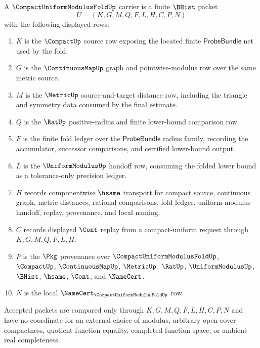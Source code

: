 \begin{definition}
\label{def:compact-uniform-modulus-fold-carrier}
A $\CompactUniformModulusFoldUp$ carrier is a finite $\BHist$ packet
$$
U=(K,G,M,Q,F,L,H,C,P,N)
$$
with the following displayed rows:
\begin{enumerate}
\item $K$ is the $\CompactUp$ source row exposing the located finite $\mathsf{ProbeBundle}$ net used by the fold.
\item $G$ is the $\ContinuousMapUp$ graph and pointwise-modulus row over the same metric source.
\item $M$ is the $\MetricUp$ source-and-target distance row, including the triangle and symmetry data consumed by the final estimate.
\item $Q$ is the $\RatUp$ positive-radius and finite lower-bound comparison row.
\item $F$ is the finite fold ledger over the $\mathsf{ProbeBundle}$ radius family, recording the accumulator, successor comparisons, and certified lower-bound output.
\item $L$ is the $\UniformModulusUp$ handoff row, consuming the folded lower bound as a tolerance-only precision ledger.
\item $H$ records componentwise $\hsame$ transport for compact source, continuous graph, metric distances, rational comparisons, fold ledger, uniform-modulus handoff, replay, provenance, and local naming.
\item $C$ records displayed $\Cont$ replay from a compact-uniform request through $K,G,M,Q,F,L,H$.
\item $P$ is the $\Pkg$ provenance over $\CompactUniformModulusFoldUp$, $\CompactUp$, $\ContinuousMapUp$, $\MetricUp$, $\RatUp$, $\UniformModulusUp$, $\BHist$, $\hsame$, $\Cont$, and $\NameCert$.
\item $N$ is the local $\NameCert_{\CompactUniformModulusFoldUp}$ row.
\end{enumerate}
Accepted packets are compared only through $K,G,M,Q,F,L,H,C,P,N$ and have no coordinate for an external choice of modulus, arbitrary open-cover compactness, quotient function equality, completed function space, or ambient real completeness.
\end{definition}

